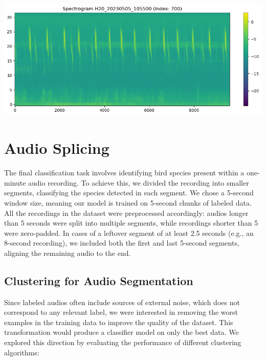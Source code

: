 \documentclass[10pt]{article}
\begin{document}
\begin{center}
  \includegraphics[width=0.7\linewidth]{img/scape_spectrogram.png}
\end{center}

\section*{Audio Splicing}

The final classification task involves identifying bird species present within a one-minute audio recording. To achieve this, we divided the recording into smaller segments, classifying the species detected in each segment. We chose a 5-second window size, meaning our model is trained on 5-second chunks of labeled data. All the recordings in the dataset were preprocessed accordingly: audios longer than 5 seconds were split into multiple segments, while recordings shorter than 5 were zero-padded. In cases of a leftover segment of at least 2.5 seconds (e.g., an 8-second recording), we included both the first and last 5-second segments, aligning the remaining audio to the end.

\subsection*{Clustering for Audio Segmentation}

Since labeled audios often include sources of external noise, which does not correspond to any relevant label, we were interested in removing the worst examples in the training data to improve the quality of the dataset. This transformation would produce a classifier model on only the best data. We explored this direction by evaluating the performance of different clustering algorithms:
\end{document}
